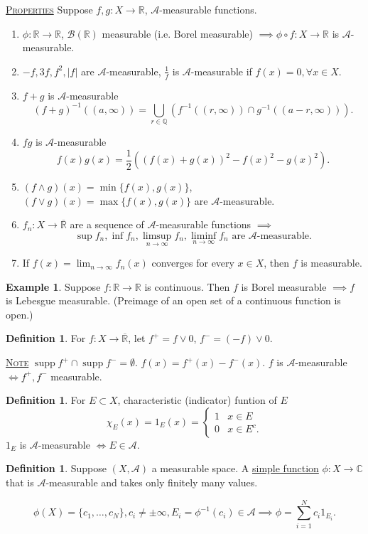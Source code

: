 \documentclass{report}
\newcommand{\R}{\mathbb{R}}
\newcommand{\C}{\mathbb{C}}
\newcommand{\Q}{\mathbb{Q}}
\newcommand{\cA}{\mathcal{A}}
\def \supp {\operatorname{supp}}
\newcommand{\fancyem}[1]{\underline{\textsc{#1}}}
\theoremstyle{definition}
\newtheorem{definition}[theorem]{Definition}
\newtheorem{example}[theorem]{Example}
\theoremstyle{remark}
\begin{document}
\fancyem{Properties} Suppose $f, g: X \to \R$, $\mathcal{A}$-measurable functions.
\begin{enumerate}
	\item $\phi: \R \to \R$, $\mathcal{B}(\R)$ measurable (i.e. Borel measurable) $\implies \phi \circ f: X \to \R$ is $\mathcal{A}$-measurable.
	\item $-f, 3f, f^2, |f|$ are $\mathcal{A}$-measurable, $\frac{1}{f}$ is $\mathcal{A}$-measurable if $f(x) = 0, \forall x \in X$.
	\item $f + g$ is $\mathcal{A}$-measurable
	\[
		(f + g)^{-1}((a, \infty)) = \bigcup_{r \in \Q}\left(f^{-1}((r, \infty)) \cap g^{-1}((a-r,\infty))\right).
	\]
	\item $fg$ is $\mathcal{A}$-measurable \[
		f(x)g(x) = \frac{1}{2}\left((f(x)+g(x))^2 - f(x)^2 - g(x)^2\right).
	\]
	\item $(f \wedge g)(x) = \min\{f(x), g(x)\}$, $(f \vee g)(x) = \max\{f(x), g(x)\}$ are $\mathcal{A}$-measurable.
	\item $f_n: X \to \overline{\R}$ are a sequence of $\mathcal{A}$-measurable functions $\implies$
	\[
		\sup f_n, \inf f_n, \limsup_{n \to \infty} f_n, \liminf_{n \to \infty} f_n \text{ are $\mathcal{A}$-measurable.}
	\]
	\item If $f(x) = \lim_{n \to \infty}f_n(x)$ converges for every $x \in X$, then $f$ is measurable.
\end{enumerate}

\begin{example}
	Suppose $f: \R \to \R$ is continuous. Then $f$ is Borel measurable $\implies f$ is Lebesgue measurable. (Preimage of an open set of a continuous function is open.)
\end{example}
\begin{definition}
	For $f: X \to \overline{\R}$, let $f^+ = f \vee 0$, $f^- = (-f) \vee 0$.
\end{definition}
\fancyem{Note} $\supp f^+ \cap \supp f^- = \emptyset$.
$f(x) = f^+(x) - f^-(x)$. $f$ is $\mathcal{A}$-measurable $\iff f^+, f^-$ measurable.

\begin{definition}
	For $E \subset X$, characteristic (indicator) funtion of $E$
	\[
		\chi_E(x) = 1_E(x) = \begin{cases}
			1 & x \in E \\
			0 & x \in E^c.
		\end{cases}	
	\]
	$1_E$ is $\mathcal{A}$-measurable $\iff E \in \mathcal{A}$.
\end{definition}

\begin{definition}
	Suppose $(X, \mathcal{A})$ a measurable space. A \underline{simple function} $\phi: X \to \C$ that is $\mathcal{A}$-measurable and takes only finitely many values.
\end{definition}
\[
	\phi(X) = \{c_1, \ldots, c_N\}, c_i \neq \pm \infty, E_i = \phi^{-1}(c_i) \in \cA \implies \phi = \sum_{i=1}^N c_i 1_{E_i}.
\]
\end{document}
